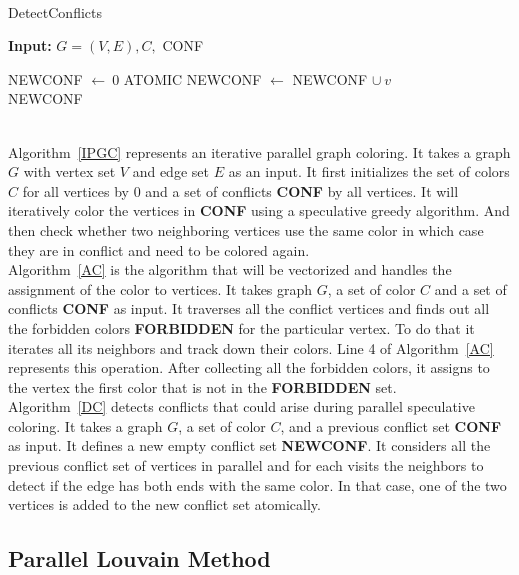 \documentclass[default,iicol]{sn-jnl}%
\theoremstyle{thmstyleone}%
\theoremstyle{thmstyletwo}%
\theoremstyle{thmstylethree}%
\begin{document}
\\
\begin{algorithm}
  \caption{DetectConflicts}\label{DC}
  \begin{flushleft}
  \textbf{Input: }$G=(V, E), C,$ CONF
  \end{flushleft}
  \begin{algorithmic}[1]
    \State NEWCONF $\leftarrow\ 0$
    \State ATOMIC NEWCONF $\leftarrow$ NEWCONF $\cup\ v$ 
    \EndIf
    \EndFor
    \EndFor \\
    \Return NEWCONF
  \end{algorithmic}
\end{algorithm}
\\
Algorithm~\ref{IPGC} represents an iterative parallel graph
coloring. It takes a graph $G$ with vertex set $V$ and edge set $E$ as
an input. It first initializes the set of colors $C$ for all vertices by 0
and a set of conflicts \textbf{CONF} by all vertices. It will iteratively color
the vertices in \textbf{CONF} using a speculative greedy algorithm. And then
check whether two neighboring vertices use the same color in which
case they are in conflict and need to be colored again. 
\\
Algorithm~\ref{AC} is the algorithm that will be vectorized and handles the assignment of the color to vertices. 
It takes graph $G$, a set of color $C$ and a set of conflicts \textbf{CONF} as
input. It traverses all the conflict vertices and finds out all the
forbidden colors \textbf{FORBIDDEN} for the particular vertex. To do that it
iterates all its neighbors and track down their colors. Line 4 of
Algorithm~\ref{AC} represents this operation.
After collecting all the
forbidden colors, it assigns to the vertex the first color that
is not in the \textbf{FORBIDDEN} set.
\\
Algorithm~\ref{DC} detects conflicts that could arise during parallel
speculative coloring. It takes a graph $G$, a set of color $C$, and a
previous conflict set \textbf{CONF} as input. It defines a new empty conflict
set \textbf{NEWCONF}. It considers all the previous conflict set of vertices in
parallel and for each visits the neighbors to detect if the edge has
both ends with the same color. In that case, one of the two vertices is added to the new
conflict set atomically.

\subsection{Parallel Louvain Method}
\label{sec:louvain}
\end{document}
